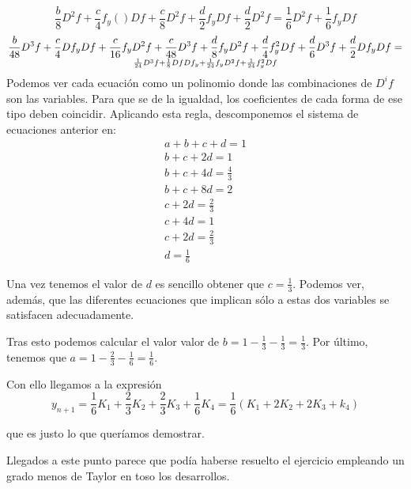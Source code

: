 \documentclass[nochap]{apuntes}
\begin{document}
\[\frac{b}{8}D^2f +\frac{c}{4}f_y()Df+\frac{c}{8}D^2f + \frac{d}{2}f_yDf+\frac{d}{2}D^2f= \frac{1}{6}D^2f+\frac{1}{6}f_yDf \]
\[\frac{b}{48}D^3f + \frac{c}{4}Df_yDf+\frac{c}{16}f_yD^2f+\frac{c}{48}D^3f+\frac{d}{8}f_yD^2f + \frac{d}{4}f_y^2Df+\frac{d}{6}D^3f+\frac{d}{2}Df_yDf= \atop\frac{1}{24}D^3f+\frac{1}{8}DfDf_y+\frac{1}{24}f_yD^2f+\frac{1}{24}f_y^2Df\]
\normalsize
Podemos ver cada ecuación como un polinomio donde las combinaciones de $D^if$ son las variables. Para que se de la igualdad, los coeficientes de cada forma de ese tipo deben coincidir. Aplicando esta regla, descomponemos el sistema de ecuaciones anterior en:
\[\begin{array}{l}
a+b+c+d=1\\
b+c+2d = 1\\
b+c+4d=\frac{4}{3} \\
b+c+8d = 2\\
c+2d = \frac{2}{3}\\
c+4d = 1 \\
c +2d = \frac{2}{3} \\
d = \frac{1}{6}
\end{array}\]

Una vez tenemos el valor de $d$ es sencillo obtener que $c=\frac{1}{3}$. Podemos ver, además, que las diferentes ecuaciones que implican sólo a estas dos variables se satisfacen adecuadamente.

Tras esto podemos calcular el valor valor de $b = 1 - \frac{1}{3}-\frac{1}{3} = \frac{1}{3}$. Por último, tenemos que $a = 1-\frac{2}{3}-\frac{1}{6} = \frac{1}{6}$.

Con ello llegamos a la expresión
\[y_{n+1} = \frac{1}{6}K_1+\frac{2}{3}K_2+\frac{2}{3}K_3+\frac{1}{6}K_4 = \frac{1}{6}(K_1+2K_2+2K_3+k_4)\]

que es justo lo que queríamos demostrar.

Llegados a este punto parece que podía haberse resuelto el ejercicio empleando un grado menos de Taylor en toso los desarrollos.
\end{document}
